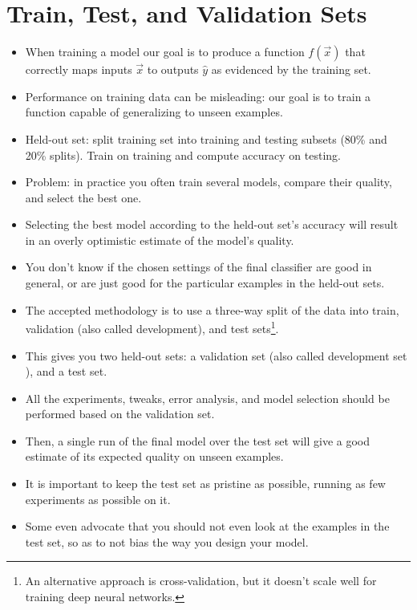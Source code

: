 \section{Train, Test, and Validation Sets}
\begin{itemize}
\item When training a model our goal is to produce a function $f(\vec{x})$ that correctly maps inputs $\vec{x}$ to outputs $\hat{y}$ as evidenced by the training set.
\item Performance on training data can be misleading: our goal is to train a function capable of generalizing to unseen examples.  
\item Held-out set: split training set into training and testing subsets (80\% and 20\% splits). Train on training and compute accuracy on testing.
\item Problem: in practice you often train several models, compare their quality, and select the best one. 
\item Selecting the best model according to the held-out set's accuracy will result in an overly optimistic estimate of the model's quality.
\item You don't know if the chosen settings of the final classifier are good in general, or are just good for the particular examples in the held-out sets.
\item The accepted methodology is to use a three-way split of the data into train, validation (also called development), and test sets\footnote{An alternative approach is cross-validation, but it doesn't scale well for training deep neural networks.}. 
\item This gives you two held-out sets: a validation set (also called development set ), and a test set.
\item All the experiments, tweaks, error analysis, and model selection should be performed based on the validation set. 
\item Then, a single run of the final model over the test set will give a good estimate of its expected quality on unseen examples. 
\item It is important to keep the test set as pristine as possible, running as few experiments as possible on it. 
\item Some even advocate that you should not even look at the examples in the test
set, so as to not bias the way you design your model.



\end{itemize}


